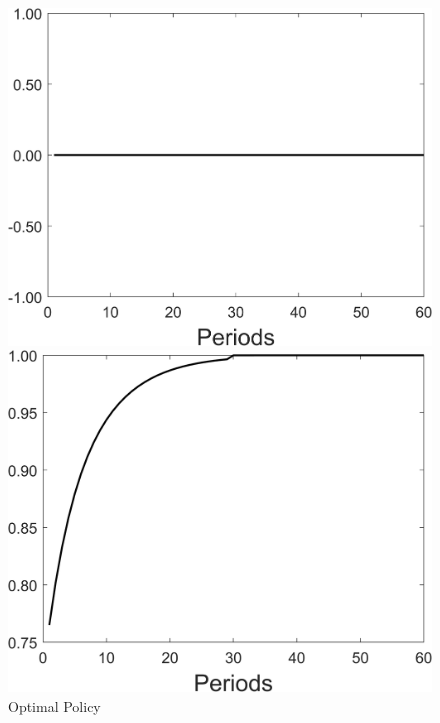 \begin{figure}[h!!]
	\centering
	\caption{Optimal Policy }\label{fig:optpol}
	\begin{minipage}[]{0.32\textwidth}
		\includegraphics[width=1\textwidth]{../../codding_model/Own/figures/Rep_agent/staticRam_LF_separate_tauul_periods59_eppsilon4.00_zeta1.40_Ad08_Ac04_thetac0.70_thetad0.56_HetGrowth1_tauul0.181_util0_withtarget0_lgd0.png}
	\end{minipage}
	\begin{minipage}[]{0.32\textwidth}
	\includegraphics[width=1\textwidth]{../../codding_model/Own/figures/Rep_agent/staticRam_LF_separate_tauul_periods59_eppsilon4.00_zeta1.40_Ad08_Ac04_thetac0.70_thetad0.56_HetGrowth1_tauul0.181_util0_withtarget1_lgd0.png}

\end{minipage}
\end{figure}
